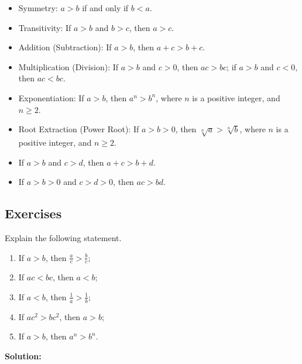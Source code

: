\documentclass[
	12pt, %
	fleqn, %
	a4paper, %
]{LegrandOrangeBook}
\begin{document}
\begin{itemize}
    \item Symmetry: \( a > b \) if and only if \( b < a \).
    \item Transitivity: If \( a > b \) and \( b > c \), then \( a > c \).
    \item Addition (Subtraction): If \( a > b \), then \( a + c > b + c \).
    \item Multiplication (Division): If \( a > b \) and \( c > 0 \), then \( ac > bc \); if \( a > b \) and \( c < 0 \), then \( ac < bc \).
    \item Exponentiation: If \( a > b \), then \( a^n > b^n \), where \( n \) is a positive integer, and \( n \geq 2 \).
    \item Root Extraction (Power Root): If \( a > b > 0 \), then \( \sqrt[n]{a} > \sqrt[n]{b} \), where \( n \) is a positive integer, and \( n \geq 2 \).
    \item If \( a > b \) and \( c > d \), then \( a + c > b + d \).
    \item If \( a > b > 0 \) and \( c > d > 0 \), then \( ac > bd \).
\end{itemize}
\subsection{Exercises}
\begin{exercise}
    Explain the following statement.
    \begin{enumerate}
        \item If \( a > b \), then \( \frac{a}{c} > \frac{b}{c} \);
        \item If \( ac < bc \), then \( a < b \);
        \item If \( a < b \), then \( \frac{1}{a} > \frac{1}{b} \);
        \item If \( ac^2 > bc^2 \), then \( a > b \);
        \item If \( a > b \), then \( a^n > b^n \).
    \end{enumerate}
\end{exercise}

\textbf{Solution:}
\end{document}
